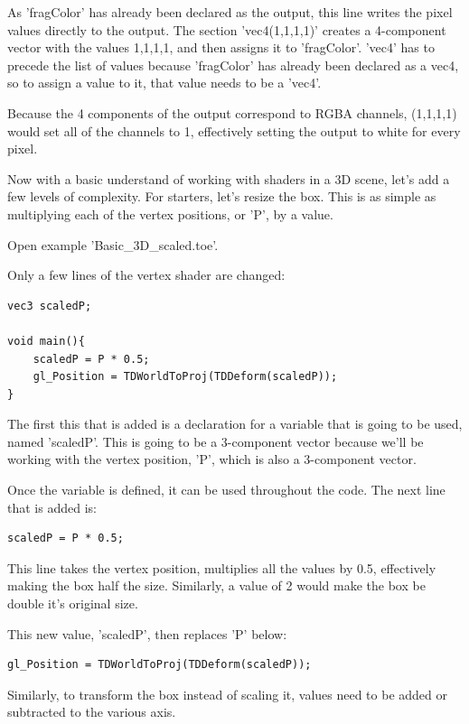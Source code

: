 \begin{fullwidth}
As 'fragColor' has already been declared as the output, this line writes the pixel values directly to the output. The section 'vec4(1,1,1,1)' creates a 4-component vector with the values 1,1,1,1, and then assigns it to 'fragColor'. 'vec4' has to precede the list of values because 'fragColor' has already been declared as a vec4, so to assign a value to it, that value needs to be a 'vec4'.

Because the 4 components of the output correspond to RGBA channels, (1,1,1,1) would set all of the channels to 1, effectively setting the output to white for every pixel.

Now with a basic understand of working with shaders in a 3D scene, let's add a few levels of complexity. For starters, let's resize the box. This is as simple as multiplying each of the vertex positions, or 'P', by a value.

Open example 'Basic\_3D\_scaled.toe'.

Only a few lines of the vertex shader are changed:

\begin{lstlisting}
vec3 scaledP;

void main(){
	scaledP = P * 0.5;
	gl_Position = TDWorldToProj(TDDeform(scaledP));
}
\end{lstlisting}

The first this that is added is a declaration for a variable that is going to be used, named 'scaledP'. This is going to be a 3-component vector because we'll be working with the vertex position, 'P', which is also a 3-component vector.

Once the variable is defined, it can be used throughout the code. The next line that is added is:

\begin{lstlisting}
scaledP = P * 0.5;
\end{lstlisting}

This line takes the vertex position, multiplies all the values by 0.5, effectively making the box half the size. Similarly, a value of 2 would make the box be double it's original size.

This new value, 'scaledP', then replaces 'P' below:

\begin{lstlisting}
gl_Position = TDWorldToProj(TDDeform(scaledP));
\end{lstlisting}

Similarly, to transform the box instead of scaling it, values need to be added or subtracted to the various axis.


\end{fullwidth}
